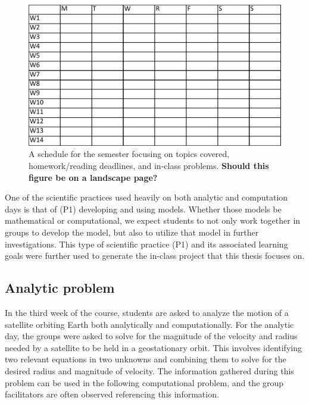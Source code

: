\documentclass{msuphddissertation}
\begin{document}
\begin{doublespace}
\begin{figure}[ht]\centering
\includegraphics[scale=0.60]{images/CH3Schedule.pdf}
\caption{A schedule for the semester focusing on topics covered, homework/reading deadlines, and in-class problems.  \textbf{Should this figure be on a landscape page?}}\label{CH3:Schedule}
\end{figure}

One of the scientific practices used heavily on both analytic and computation days is that of (P1) developing and using models.  Whether those models be mathematical or computational, we expect students to not only work together in groups to develop the model, but also to utilize that model in further investigations.  This type of scientific practice (P1) and its associated learning goals \cite{Irving2017} were further used to generate the in-class project that this thesis focuses on.

\subsection{Analytic problem}

In the third week of the course, students are asked to analyze the motion of a satellite orbiting Earth both analytically and computationally.  For the analytic day, the groups were asked to solve for the magnitude of the velocity and radius needed by a satellite to be held in a geostationary orbit.  This involves identifying two relevant equations in two unknowns and combining them to solve for the desired radius and magnitude of velocity.  The information gathered during this problem can be used in the following computational problem, and the group facilitators are often observed referencing this information.


\end{doublespace}
\end{document}
